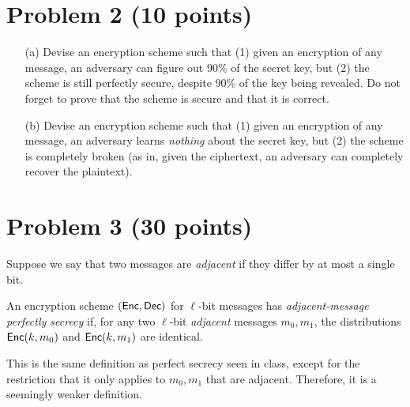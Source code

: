 \section{Problem 2 (10 points)}

\begin{itemize}
	\item[(a)] Devise an encryption scheme such that (1) given an encryption of any message, an adversary can figure out 90\% of the secret key, but (2) the scheme is still perfectly secure, despite 90\% of the key being revealed.  Do not forget to prove that the scheme is secure and that it is correct.
	\item[(b)] Devise an encryption scheme such that (1) given an encryption of any message, an adversary learns \emph{nothing} about the secret key, but (2) the scheme is completely broken (as in, given the ciphertext, an adversary can completely recover the plaintext).
\end{itemize}


\section{Problem 3 (30 points)}

Suppose we say that two messages are \emph{adjacent} if they differ by at most a single bit.

\begin{definition}\label{def:1}An encryption scheme $({\sf{Enc}},{\sf{Dec}})$ for $\ell$-bit messages has \emph{adjacent-message perfectly secrecy} if, for any two $\ell$-bit \emph{adjacent} messages $m_0,m_1$, the distributions ${\sf{Enc}}(k,m_0)$ and ${\sf{Enc}}(k,m_1)$ are identical.  
\end{definition}

This is the same definition as perfect secrecy seen in class, except for the restriction that it only applies to $m_0,m_1$ that are adjacent.  Therefore, it is a seemingly weaker definition.

